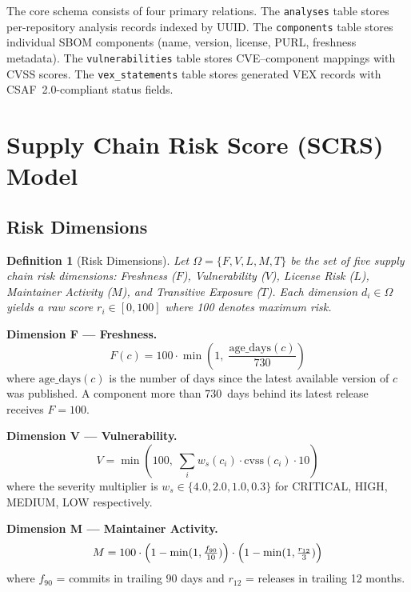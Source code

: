 \documentclass[11pt,twocolumn]{article}
\newtheorem{definition}{Definition}
\begin{document}
The core schema consists of four primary relations. The \texttt{analyses} table
stores per-repository analysis records indexed by UUID. The \texttt{components}
table stores individual SBOM components (name, version, license, PURL, freshness
metadata). The \texttt{vulnerabilities} table stores CVE--component mappings with
CVSS scores. The \texttt{vex\_statements} table stores generated VEX records with
CSAF~2.0-compliant status fields.

\section{Supply Chain Risk Score (SCRS) Model}

\subsection{Risk Dimensions}

\begin{definition}[Risk Dimensions]
Let $\Omega = \{F, V, L, M, T\}$ be the set of five supply chain risk
dimensions: Freshness ($F$), Vulnerability ($V$), License Risk ($L$), Maintainer
Activity ($M$), and Transitive Exposure ($T$). Each dimension $d_i \in \Omega$
yields a raw score $r_i \in [0, 100]$ where 100 denotes maximum risk.
\end{definition}

\noindent\textbf{Dimension F --- Freshness.}
\begin{equation}
F(c) = 100 \cdot \min\!\left(1,\; \frac{\mathrm{age\_days}(c)}{730}\right)
\end{equation}
where $\mathrm{age\_days}(c)$ is the number of days since the latest available
version of $c$ was published. A component more than 730~days behind its latest
release receives $F = 100$.

\noindent\textbf{Dimension V --- Vulnerability.}
\begin{equation}
V = \min\!\left(100,\; \sum_i w_s(c_i) \cdot \mathrm{cvss}(c_i) \cdot 10\right)
\end{equation}
where the severity multiplier is
$w_s \in \{4.0, 2.0, 1.0, 0.3\}$ for CRITICAL, HIGH, MEDIUM, LOW respectively.

\noindent\textbf{Dimension M --- Maintainer Activity.}
\begin{equation}
M = 100 \cdot \Bigl(1 - \min(1, \tfrac{f_{90}}{10})\Bigr)
       \cdot \Bigl(1 - \min(1, \tfrac{r_{12}}{3})\Bigr)
\end{equation}
where $f_{90}$ = commits in trailing 90 days and $r_{12}$ = releases in trailing
12 months.
\end{document}
